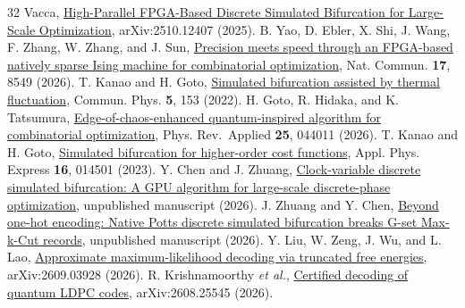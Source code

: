 \documentclass[aps,prapplied,reprint,superscriptaddress,amsmath,amssymb,floatfix,nofootinbib]{revtex4-2}
\begin{document}
\begin{thebibliography}{32}
  Vacca, \href{https://arxiv.org/abs/2510.12407}{High-Parallel
  FPGA-Based Discrete Simulated Bifurcation for Large-Scale
  Optimization}, arXiv:2510.12407 (2025).
 B. Yao, D. Ebler, X. Shi, J. Wang, F. Zhang, W. Zhang, and J. Sun,
  \href{https://doi.org/10.1038/s41467-026-75119-0}{Precision meets
  speed through an FPGA-based natively sparse Ising machine for
  combinatorial optimization}, Nat. Commun. \textbf{17}, 8549 (2026).
 T. Kanao and H. Goto,
  \href{https://doi.org/10.1038/s42005-022-00929-9}{Simulated
  bifurcation assisted by thermal fluctuation}, Commun. Phys.
  \textbf{5}, 153 (2022).
 H. Goto, R. Hidaka, and K. Tatsumura,
  \href{https://doi.org/10.1103/2qd9-x6v8}{Edge-of-chaos-enhanced
  quantum-inspired algorithm for combinatorial optimization}, Phys.
  Rev.~Applied \textbf{25}, 044011 (2026).
 T. Kanao and H. Goto,
  \href{https://doi.org/10.35848/1882-0786/acaba9}{Simulated bifurcation
  for higher-order cost functions}, Appl. Phys. Express \textbf{16},
  014501 (2023).
 Y. Chen and J. Zhuang,
  \href{https://github.com/yaochengchen/clock-dsb}{Clock-variable
  discrete simulated bifurcation: A GPU algorithm for large-scale
  discrete-phase optimization}, unpublished manuscript (2026).
 J. Zhuang and Y. Chen,
  \href{https://github.com/yaochengchen/PdSB}{Beyond one-hot encoding:
  Native Potts discrete simulated bifurcation breaks G-set Max-k-Cut
  records}, unpublished manuscript (2026).
 Y. Liu, W. Zeng, J. Wu, and L. Lao,
  \href{https://arxiv.org/abs/2609.03928}{Approximate maximum-likelihood
  decoding via truncated free energies}, arXiv:2609.03928 (2026).
 R. Krishnamoorthy \emph{et al.},
  \href{https://arxiv.org/abs/2608.25545}{Certified decoding of quantum
  LDPC codes}, arXiv:2608.25545 (2026).
\end{thebibliography}
\end{document}
